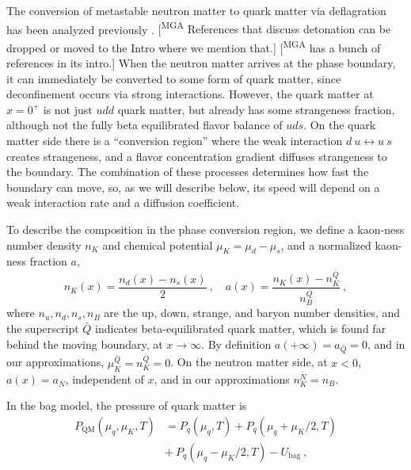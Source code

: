\documentclass[10pt,superscriptaddress,
amsmath,aps,prl,twocolumn,nofootinbib]{revtex4-1}
\newcommand{\mga}[1]{{\color[rgb]{0.8,0,0}#1}}
\newcommand{\mgacom}[1]{\textsf{\color[rgb]{0.6,0,0}[\textsuperscript{MGA} #1]}}
\newcommand{\Nbar}{{\ensuremath{\bar N}}}
\newcommand{\Qbar}{{\ensuremath{\bar Q}}}
\begin{document}
The  conversion of metastable neutron matter to quark matter \mga{via deflagration} has been analyzed previously \cite{Olinto:1986je,horvath:1988stability,Heiselberg:1992dx,lugones:1994combustion,Pagliara:2013tza,Alford:2014jha,Drago:2015fpa,Furusawa:2015vfn}.
\mgacom{References that discuss detonation can be dropped or moved to the Intro where we mention that.} 
\mgacom{\cite{Furusawa:2015gjj} has a bunch of references in its intro.}
When the neutron matter arrives at the phase boundary, it can immediately be converted to some form of quark matter, since deconfinement occurs via strong interactions. However, the quark matter at $x=0^+$ is not just $udd$ quark matter, but already has some strangeness fraction, although not the fully beta equilibrated flavor balance of $uds$. On the quark matter side there is a ``conversion region'' where the weak interaction $d\ u \leftrightarrow u\ s$ creates strangeness, and a flavor concentration gradient diffuses strangeness to the boundary. The combination of these processes determines how fast the boundary can move, so, as we will describe below,  its speed will depend on a weak interaction rate and a diffusion coefficient.

To describe the composition in the phase conversion region, we define a kaon-ness number density $n_K$ and chemical potential $\mu_K=\mu_d-\mu_s$, and a normalized kaon-ness fraction $a$,
\begin{equation}
n_K(x) = \frac{n_d(x) - n_s(x)}{2}\ ,\quad a(x) = \frac{n_K(x) - n_K^\Qbar}{n_B^\Qbar} \ ,
\label{eq:def_of_a}
\end{equation}
where $n_u,n_d,n_s,n_B$ are the up, down, strange, and baryon number densities, 
and the superscript $\Qbar$ indicates beta-equilibrated quark matter, which is found far behind the moving boundary, at $x \rightarrow \infty$. By definition $a(+\infty)=a_\Qbar=0$, and in our approximations, $\mu_K^\Qbar=n_K^\Qbar=0$.
On the neutron matter side, at $x<0$, $a(x)=a_\Nbar$, independent of $x$,
and in our approximations $n_K^\Nbar=n_B$.

In the bag model, the pressure of quark matter is
\begin{equation}
\begin{array}{rl}
 P_\text{QM}(\mu_q,\mu_K,T) &= P_q(\mu_q,T)
 + P_q(\mu_q{+}\mu_K/2,T)  \\[1ex]
  & +\ P_q(\mu_q{-}\mu_K/2,T) - U_\text{bag} \ ,
\end{array}
 \label{eq:QM-bag-EoS}
\end{equation}
\end{document}
